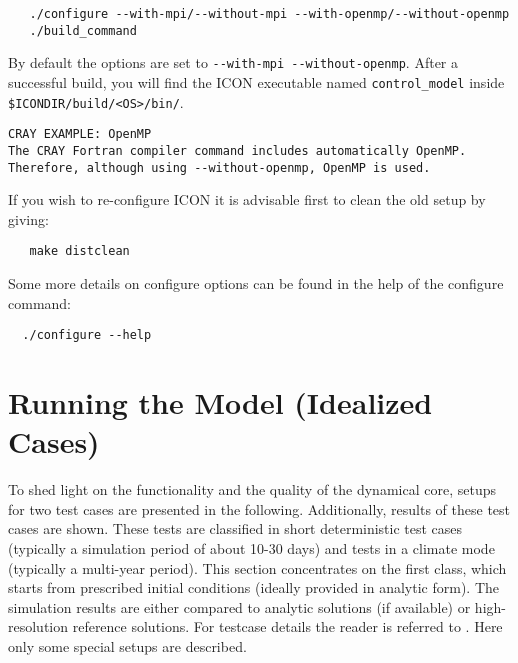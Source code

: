 \begin{small}
  \begin{verbatim}
   ./configure --with-mpi/--without-mpi --with-openmp/--without-openmp
   ./build_command
  \end{verbatim}
\end{small}

By default the options are set to \verb+--with-mpi --without-openmp+. After a successful build, you will find the ICON executable named \verb+control_model+ inside \verb+$ICONDIR/build/<OS>/bin/+.

\begin{Verbatim}[frame=single]
CRAY EXAMPLE: OpenMP
The CRAY Fortran compiler command includes automatically OpenMP. 
Therefore, although using --without-openmp, OpenMP is used.
\end{Verbatim}

If you wish to re-configure ICON it is advisable first to clean the old setup by giving:

\begin{small}
  \begin{verbatim}
   make distclean  
  \end{verbatim}
\end{small}

Some more details on configure options can be found in the help of the configure command:

\begin{small}
 \begin{verbatim}
  ./configure --help
 \end{verbatim}
\end{small}

\section{Running the Model (Idealized Cases)}
\label{chap:UG_running_model_idealized}

To shed light on the functionality and the quality of the dynamical core, setups for two test cases are presented in the following. Additionally, results of these test cases are shown. These tests are classified in short deterministic test cases (typically a simulation period of about 10-30 days) and tests in a climate mode (typically a multi-year period). This section concentrates on the first class, which starts from prescribed initial conditions (ideally provided in analytic form). The simulation results are either compared to analytic solutions (if available) or high-resolution reference solutions. %
For testcase details the reader is referred to \cite{Zaengl:2013}. Here only some special setups are described.

